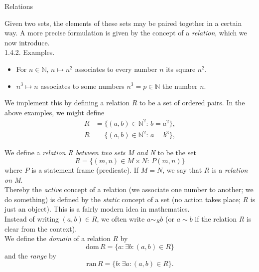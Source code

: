 \documentclass[smaller,hyperref={CJKbookmarks=true}]{beamer}
\newcommand{\N}{\mathbb{N}} \newcommand{\Z}{\mathbb{Z}} \newcommand{\Q}{\mathbb{Q}}
\begin{document}
\begin{frame}{Relations}
\begin{spacing}{1.1}
\vspace*{9pt}
Given two sets, the elements of these sets may be paired together in a
certain way. A more precise formulation is given by the concept of a
\emph{relation}, which we now introduce.\\[6pt]
\alert{1.4.2. Examples.}
\begin{itemize}
  \item For $n\in\N,\,n\mapsto n^2$ associates to every number $n$ its square $n^2$.
  \item $n^3\mapsto n$ associates to some numbers $n^3=p\in\N$ the number $n$.
\end{itemize}
We implement this by defining a relation $R$ to be a set of ordered pairs. In
the above examples, we might define
\begin{align*}
  R &=\{(a,b)\in\N^2\!:\,b=a^2\}, \\
  R &=\{(a,b)\in\N^2\!:\,a=b^3\},
\end{align*}
\end{spacing}
\newpage
\begin{spacing}{0.95}
We define a \emph{relation R between two sets M and N} to be the set
\setcounter{equation}{0}
\begin{equation}\label{1.4.1}
  R=\{(m,n)\in M\times N\!:\,P(m,n)\}
\end{equation}
where $P$ is a statement frame (predicate). If $M=N$, we say that $R$ is a \emph{relation on M}.\\[5pt]
Thereby the \emph{active} concept of a relation (we associate one number to
another; we do something) is defined by the \emph{static} concept of a set (no
action takes place; $R$ is just an object). This is a fairly modern idea in
mathematics.\\[5pt]
Instead of writing $(a,b)\in R$, we often write $a\sim_R b$ (or $a\sim b$ if the relation $R$ is clear from the context).\\[4pt]
We define the \emph{domain} of a relation $R$ by
\[\text{dom}\,R=\{a\!:\exists b\!:(a,b)\in R\}\]
and the \emph{range} by
\[\text{ran}\,R=\{b\!:\exists a\!:(a,b)\in R\}.\]
\end{spacing}
\end{frame}
\end{document}
